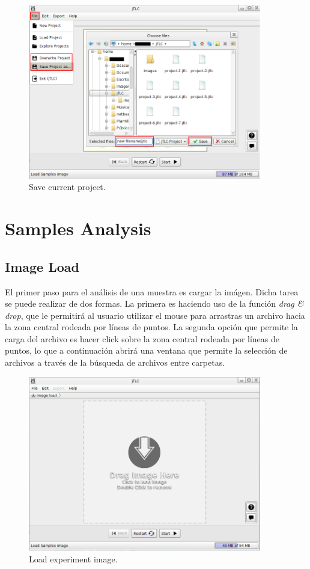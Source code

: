 \begin{figure}[H]
	\vspace{0cm}
	\centering
	\includegraphics[width=385px]{imagenes/save_project}
	\centering
	\vspace{-0.4cm}
	\caption{Save current project.}
	\label{fig:save_project}
	\vspace{-0.25cm}
\end{figure}
\newpage

\chapter{Samples Analysis}
\section{Image Load}
El primer paso para el análisis de una muestra es cargar la im\'agen. Dicha tarea se puede realizar de dos formas. La primera es haciendo uso de la funci\'on \emph{drag & drop}, que le permitir\'a al usuario utilizar el mouse para arrastras un archivo hacia la zona central rodeada por l\'ineas de puntos. La segunda opci\'on que permite la carga del archivo es hacer click sobre la zona central rodeada por l\'ineas de puntos, lo que a continuaci\'on abrir\'a una ventana que permite la selecci\'on de archivos a trav\'es de la b\'usqueda de archivos entre carpetas.
\begin{figure}[H]
	\vspace{0cm}
	\centering
	\includegraphics[width=385px]{imagenes/drop}
	\centering
	\vspace{-0.4cm}
	\caption{Load experiment image.}
	\label{fig:image_load}
	\vspace{-0.25cm}
\end{figure}


